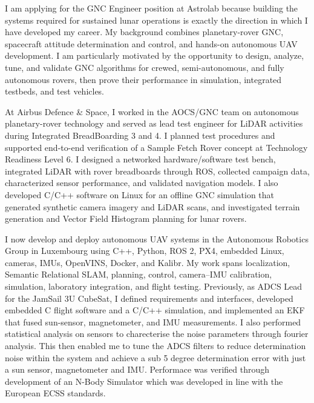 \documentclass[10pt,a4paper]{article}
\newcommand{\BodySize}{9.25pt}
\newcommand{\BodyLineSize}{12.1pt}
\newcommand{\ParagraphSpacing}{10pt}       %
\newcommand{\LetterParagraph}[1]{%
    \noindent #1\par
    \addvspace{\ParagraphSpacing}%
}
\begin{document}
{\fontsize{\BodySize}{\BodyLineSize}\selectfont
    \color{CVDarkGray}

    \LetterParagraph{%
        I am applying for the GNC Engineer position at Astrolab because building the
        systems required for sustained lunar operations is exactly the direction in
        which I have developed my career. My background combines planetary-rover GNC,
        spacecraft attitude determination and control, and hands-on autonomous UAV
        development. I am particularly motivated by the opportunity to design, analyze,
        tune, and validate GNC algorithms for crewed, semi-autonomous, and fully
        autonomous rovers, then prove their performance in simulation, integrated
        testbeds, and test vehicles.%
    }

    \LetterParagraph{%
        At Airbus Defence \& Space, I worked in the AOCS/GNC team on autonomous
        planetary-rover technology and served as lead test engineer for LiDAR activities
        during Integrated BreadBoarding 3 and 4. I planned test procedures and supported
        end-to-end verification of a Sample Fetch Rover concept at Technology Readiness
        Level 6. I designed a networked hardware/software test bench, integrated LiDAR
        with rover breadboards through ROS, collected campaign data, characterized
        sensor performance, and validated navigation models. I also developed C/C++
        software on Linux for an offline GNC simulation that generated synthetic camera
        imagery and LiDAR scans, and investigated terrain generation and Vector Field
        Histogram planning for lunar rovers.%
    }

    \LetterParagraph{%
        I now develop and deploy autonomous UAV systems in the Autonomous Robotics
        Group in Luxembourg using C++, Python, ROS 2, PX4, embedded Linux, cameras,
        IMUs, OpenVINS, Docker, and Kalibr. My work spans localization, Semantic
        Relational SLAM, planning, control, camera--IMU calibration, simulation,
        laboratory integration, and flight testing. Previously, as ADCS Lead for the
        JamSail 3U CubeSat, I defined requirements and interfaces, developed embedded C
        flight software and a C/C++ simulation, and implemented an EKF that fused
        sun-sensor, magnetometer, and IMU measurements. I also performed statistical
        analysis on sensors to charecterise the noise parameters through fourier
        analysis. This then enabled me to tune the ADCS filters to reduce determination
        noise within the system and achieve a sub 5 degree determination error with
        just a sun sensor, magnetometer and IMU. Performace was verified through
        development of an N-Body Simulator which was developed in line with the
        European ECSS standards.%
    }

}
\end{document}
